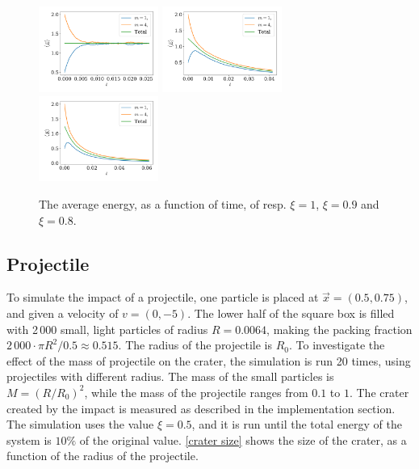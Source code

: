 \documentclass{article}
\begin{document}
    \begin{figure}[H]
        \centering
        \hspace{-5mm}
        \includegraphics[width=0.35\textwidth]{../plots/problem3/xi_0/energy_ex3.pdf}
        \hspace{-4mm}
        \includegraphics[width=0.35\textwidth]{../plots/problem3/xi_1/energy_ex3.pdf}
        \hspace{-4mm}
        \includegraphics[width=0.35\textwidth]{../plots/problem3/xi_2/energy_ex3.pdf}
        \hspace{-5mm}
        \caption{The average energy, as a function of time, of resp.
        $\xi=1$, $\xi=0.9$ and $\xi=0.8$.}
        \label{problem2 av en}
    \end{figure}

    \subsection*{Projectile}
    To simulate the impact of a projectile, one particle is placed at $\vec x = (0.5, 0.75)$, and given a velocity of $v = (0, -5)$.
    The lower half of the square box is filled with 2\,000 small, light particles of radius $R = 0.0064$, making the packing fraction $2\,000 \cdot \pi R^2 / 0.5 \approx 0.515$.
    The radius of the projectile is $R_0$.
    To investigate the effect of the mass of projectile on the crater, the simulation is run 20 times, using projectiles with different radius.
    The mass of the small particles is $M=(R/R_0)^2$, while the mass of the projectile ranges from $0.1$ to $1$.
    The crater created by the impact is measured as described in the implementation section.
    The simulation uses the value $\xi = 0.5$, and it is run until the total energy of the system is $10\%$ of the original value.
    \autoref{crater size} shows the size of the crater, as a function of the radius of the projectile.
    
\end{document}
